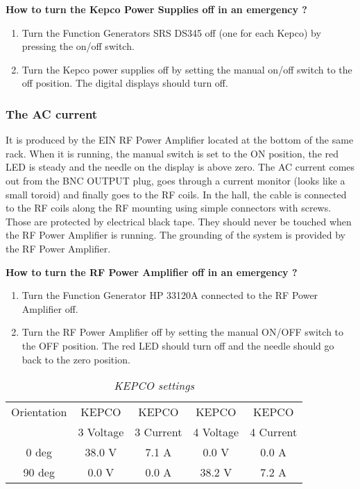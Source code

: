 {\begin{safetyen}{10}{5}
\centerline {\bf How to turn the Kepco Power Supplies off in an
emergency ?}

\begin{enumerate}

\item Turn the Function Generators SRS DS345 off (one for each Kepco) by
pressing the on/off switch.

\item Turn the Kepco power supplies off by setting the manual on/off
switch to the off position. The digital 
displays should turn off. 

\end{enumerate} 

\subsubsection{ The AC current}

It is produced by the EIN RF Power Amplifier located at the bottom of
the same rack. When 
it is running, the manual switch is set to the ON position, the red LED
is steady and the needle on the display is
above zero. The AC current comes out from the BNC OUTPUT plug, goes
through a current monitor (looks like a small
toroid) and finally goes to the RF coils. In the hall, the cable is
connected to the RF coils along the RF
mounting using simple connectors with screws. Those are protected by
electrical black tape. They should never be
touched when the RF Power Amplifier is running.  The grounding of the
system is provided by the RF Power Amplifier.

\centerline {\bf How to turn the RF Power Amplifier off in an emergency
?}

\begin{enumerate}

\item Turn the Function Generator HP 33120A connected to the RF Power
Amplifier off.

\item Turn the RF Power Amplifier off by setting the manual ON/OFF
switch to the OFF position. The red LED 
should turn off and the needle should go back to the zero position. 

\end{enumerate} 

\begin{table}[h]
\begin{center}
\caption{ \label{settings} {\it KEPCO settings} }\begin{tabular}[b]
{|c|c|c|c|c|}
\hline
Orientation & KEPCO     & KEPCO     & KEPCO     & KEPCO \\
            & 3 Voltage & 3 Current & 4 Voltage & 4 Current
\\ \hline
0 deg & 38.0 V & 7.1 A & 0.0 V & 0.0 A \\
90 deg & 0.0 V & 0.0 A & 38.2 V & 7.2 A \\ \hline
\end{tabular}
 \end{center}
  \end{table}


\end{safetyen}}
